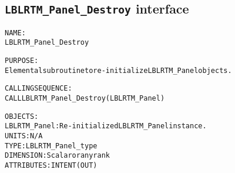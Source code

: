 \subsection{\texttt{LBLRTM\_Panel\_Destroy} interface}
  \label{sec:LBLRTM_Panel_Destroy_interface}
  \begin{alltt}
 
  NAME:
        LBLRTM_Panel_Destroy
 
  PURPOSE:
        Elemental subroutine to re-initialize LBLRTM_Panel objects.
 
  CALLING SEQUENCE:
        CALL LBLRTM_Panel_Destroy( LBLRTM_Panel )
 
  OBJECTS:
        LBLRTM_Panel: Re-initialized LBLRTM_Panel instance.
                      UNITS:      N/A
                      TYPE:       LBLRTM_Panel_type
                      DIMENSION:  Scalar or any rank
                      ATTRIBUTES: INTENT(OUT)
 
  \end{alltt}
